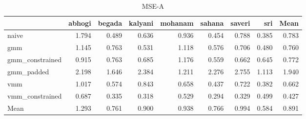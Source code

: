 \begin{table}
\caption{MSE-A}
\label{tab:mseA}
\begin{tabular}{lrrrrrrrr}
\toprule
 & abhogi & begada & kalyani & mohanam & sahana & saveri & sri & Mean \\
\midrule
naive & 1.794 & 0.489 & 0.636 & 0.936 & 0.454 & 0.788 & 0.385 & 0.783 \\
gmm & 1.145 & 0.763 & 0.531 & 1.118 & 0.576 & 0.706 & 0.480 & 0.760 \\
gmm_constrained & 0.915 & 0.763 & 0.685 & 1.176 & 0.559 & 0.662 & 0.645 & 0.772 \\
gmm_padded & 2.198 & 1.646 & 2.384 & 1.211 & 2.276 & 2.755 & 1.113 & 1.940 \\
vmm & 1.017 & 0.574 & 0.843 & 0.658 & 0.437 & 0.722 & 0.382 & 0.662 \\
vmm_constrained & 0.687 & 0.335 & 0.318 & 0.529 & 0.294 & 0.329 & 0.499 & 0.427 \\
Mean & 1.293 & 0.761 & 0.900 & 0.938 & 0.766 & 0.994 & 0.584 & 0.891 \\
\bottomrule
\end{tabular}
\end{table}
